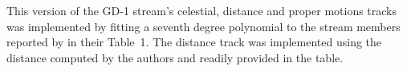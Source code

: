 This version of the GD-1 stream's celestial, distance and proper motions tracks was implemented by fitting a seventh degree polynomial to the stream members reported by \citet{Ibata2021} in their Table~1. The distance track was implemented using the distance computed by the authors and readily provided in the table.
